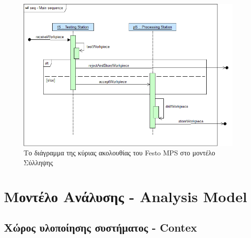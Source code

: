 \documentclass[a4paper,12pt,twoside]{report}
\begin{document}
{\begin{appendices}
\begin{figure}[hp]
				\end{figure}
				\begin{figure}[hp]
					\centering
					\includegraphics[scale=0.45]{ConceptionalModel_seq-MainSequence.png}
					\caption{Το διάγραμμα της κύριας ακολουθίας του Festo MPS στο μοντέλο Σύλληψης}
					\label{φωτ:Το διάγραμμα της κύριας ακολουθίας του Festo MPS στο μοντέλο Σύλληψης}
				\end{figure}

		\FloatBarrier		
		\section{Μοντέλο Ανάλυσης - Analysis Model}
		
			\FloatBarrier
			\subsection{Χώρος υλοποίησης συστήματος - Contex}


\end{appendices}}
\end{document}
